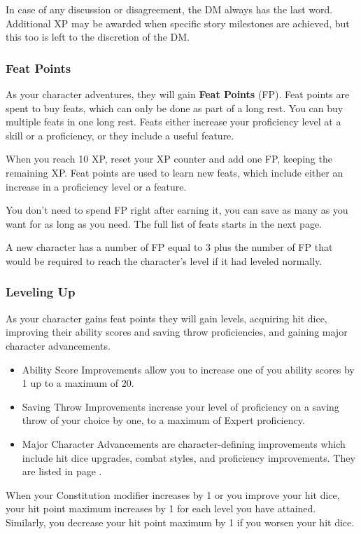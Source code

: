     In case of any discussion or disagreement, the DM always has the last word.
    Additional XP may be awarded when specific story milestones are achieved, but this too is left to the discretion of the DM.

    \newpage

\subsubsection{Feat Points}
    As your character adventures, they will gain \textbf{Feat Points} (FP).
    Feat points are spent to buy feats, which can only be done as part of a long rest.
    You can buy multiple feats in one long rest.
    Feats either increase your proficiency level at a skill or a proficiency, or they include a useful feature.

    When you reach 10 XP, reset your XP counter and add one FP, keeping the remaining XP.
    Feat points are used to learn new feats, which include either an increase in a proficiency level or a feature.

    You don't need to spend FP right after earning it, you can save as many as you want for as long as you need.
    The full list of feats starts in the next page.

    A new character has a number of FP equal to 3 plus the number of FP that would be required to reach the character's level if it had leveled normally.

\subsubsection{Leveling Up}
    As your character gains feat points they will gain levels, acquiring hit dice, improving their ability scores and saving throw proficiencies, and gaining major character advancements.
    \begin{itemize}
        \item Ability Score Improvements allow you to increase one of you ability scores by 1 up to a maximum of 20.
        \item Saving Throw Improvements increase your level of proficiency on a saving throw of your choice by one, to a maximum of Expert proficiency.
        \item Major Character Advancements are character-defining improvements which include hit dice upgrades, combat styles, and proficiency improvements.
        They are listed in page \pageref{ssec::majorcharacteradvancement}.
    \end{itemize}

    When your Constitution modifier increases by 1 or you improve your hit dice, your hit point maximum increases by 1 for each level you have attained.
    Similarly, you decrease your hit point maximum by 1 if you worsen your hit dice.

    \newpage
